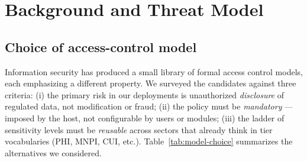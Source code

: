 \documentclass[11pt]{article}
\begin{document}
\section{Background and Threat Model}

\subsection{Choice of access-control model}
\label{sec:bla-rationale}

Information security has produced a small library of formal access
control models, each emphasizing a different property. We surveyed the
candidates against three criteria: (i) the primary risk in our
deployments is unauthorized \emph{disclosure} of regulated data, not
modification or fraud; (ii) the policy must be \emph{mandatory} ---
imposed by the host, not configurable by users or modules; (iii) the
ladder of sensitivity levels must be \emph{reusable} across sectors
that already think in tier vocabularies (PHI, MNPI, CUI, etc.).
Table~\ref{tab:model-choice} summarizes the alternatives we
considered.
\end{document}
